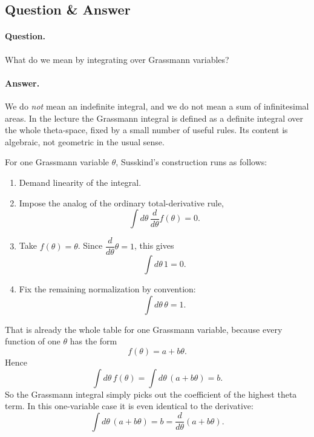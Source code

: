 \subsection{Question \& Answer}

\paragraph{Question.} What do we mean by integrating over Grassmann variables?

\paragraph{Answer.} We do \emph{not} mean an indefinite integral, and we do not mean a sum of infinitesimal areas. In the lecture the Grassmann integral is defined as a definite integral over the whole theta-space, fixed by a small number of useful rules. Its content is algebraic, not geometric in the usual sense.

For one Grassmann variable \(\theta\), Susskind's construction runs as follows:
\begin{enumerate}
\item Demand linearity of the integral.
\item Impose the analog of the ordinary total-derivative rule,
\[
\int d\theta\,\frac{d}{d\theta}f(\theta)=0.
\]
\item Take \(f(\theta)=\theta\). Since \(\dfrac{d}{d\theta}\theta=1\), this gives
\begin{equation}
\int d\theta\,1=0.
\end{equation}
\item Fix the remaining normalization by convention:
\begin{equation}
\int d\theta\,\theta=1.
\end{equation}
\end{enumerate}
That is already the whole table for one Grassmann variable, because every function of one \(\theta\) has the form
\begin{equation}
f(\theta)=a+b\theta.
\end{equation}
Hence
\begin{equation}
\int d\theta\,f(\theta)=\int d\theta\,(a+b\theta)=b.
\end{equation}
So the Grassmann integral simply picks out the coefficient of the highest theta term. In this one-variable case it is even identical to the derivative:
\begin{equation}
\int d\theta\,(a+b\theta)=b=\frac{d}{d\theta}(a+b\theta).
\end{equation}

